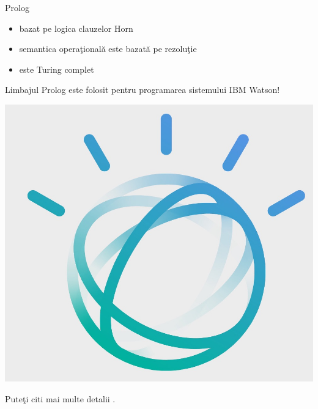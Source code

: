 \documentclass[xcolor=x11names,compress,10pt]{beamer}
\begin{document}
\begin{frame}{Prolog}

\vfill\begin{itemize}
	\item bazat pe logica clauzelor Horn
	\item semantica opera\c tional\u a este bazat\u a pe rezolu\c tie
	\item este Turing complet
\end{itemize}
\pause\vfill

\begin{block}{}
Limbajul Prolog este folosit pentru programarea sistemului IBM Watson!
\begin{center}
\includegraphics[scale=0.05]{img/watson}
\end{center}
Pute\c ti citi mai multe detalii   \href{https://www.cs.nmsu.edu/ALP/2011/03/natural-language-processing-with-prolog-in-the-ibm-watson-system/}{}.
\end{block}

\end{frame}
\end{document}
